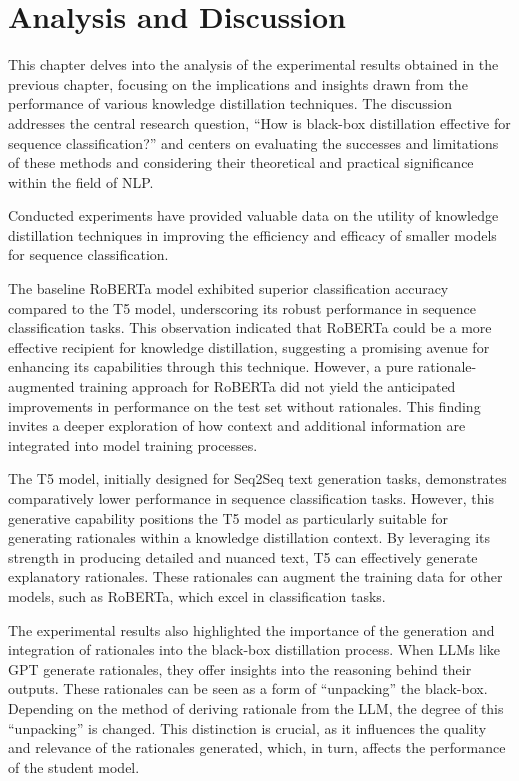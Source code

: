 \chapter{Analysis and Discussion}
\label{chap:eval}


This chapter delves into the analysis of the experimental results obtained in the previous chapter, focusing on the implications and insights drawn from the performance of various knowledge distillation techniques. The discussion addresses the central research question, ``How is black-box distillation effective for sequence classification?'' and centers on evaluating the successes and limitations of these methods and considering their theoretical and practical significance within the field of NLP\@.

Conducted experiments have provided valuable data on the utility of knowledge distillation techniques in improving the efficiency and efficacy of smaller models for sequence classification.

The baseline RoBERTa model exhibited superior classification accuracy compared to the T5 model, underscoring its robust performance in sequence classification tasks. This observation indicated that RoBERTa could be a more effective recipient for knowledge distillation, suggesting a promising avenue for enhancing its capabilities through this technique. However, a pure rationale-augmented training approach for RoBERTa did not yield the anticipated improvements in performance on the test set without rationales. This finding invites a deeper exploration of how context and additional information are integrated into model training processes. 

The T5 model, initially designed for Seq2Seq text generation tasks, demonstrates comparatively lower performance in sequence classification tasks. However, this generative capability positions the T5 model as particularly suitable for generating rationales within a knowledge distillation context. By leveraging its strength in producing detailed and nuanced text, T5 can effectively generate explanatory rationales. These rationales can augment the training data for other models, such as RoBERTa, which excel in classification tasks.

The experimental results also highlighted the importance of the generation and integration of rationales into the black-box distillation process. When LLMs like GPT generate rationales, they offer insights into the reasoning behind their outputs. These rationales can be seen as a form of ``unpacking'' the black-box. Depending on the method of deriving rationale from the LLM, the degree of this ``unpacking'' is changed. This distinction is crucial, as it influences the quality and relevance of the rationales generated, which, in turn, affects the performance of the student model.

